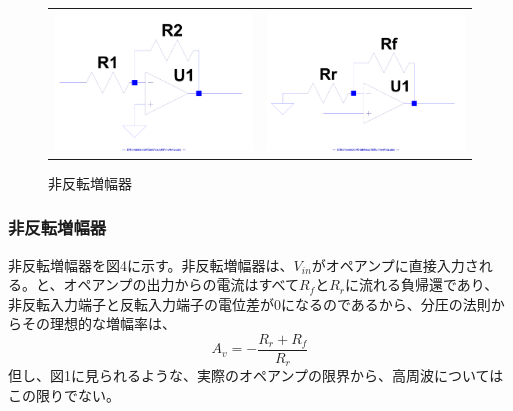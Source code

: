 \documentclass[10pt,a4j,dvipdfmx]{jsarticle}
\begin{document}
\begin{figure}[H]
    \begin{tabular}{cc}
      \begin{minipage}[t]{0.45\hsize}
        \centering
        \includegraphics[width=6cm, angle=270]{invAmp.pdf}
        \caption{反転増幅器}
      \end{minipage} &
      \begin{minipage}[t]{0.45\hsize}
        \centering
        \includegraphics[width = 6cm, angle=270]{uninvAmp.pdf}
        \caption{非反転増幅器}
      \end{minipage}
    \end{tabular}
  \end{figure}

\subsubsection{非反転増幅器}
非反転増幅器を図4に示す。非反転増幅器は、$V_{in}$がオペアンプに直接入力される。と、オペアンプの出力からの電流はすべて$R_f$と$R_r$に流れる負帰還であり、非反転入力端子と反転入力端子の電位差が0になるのであるから、分圧の法則からその理想的な増幅率は、
\begin{equation}
A_v = -\frac{R_r+R_f}{R_r}
\end{equation}
但し、図1に見られるような、実際のオペアンプの限界から、高周波についてはこの限りでない。
\end{document}
